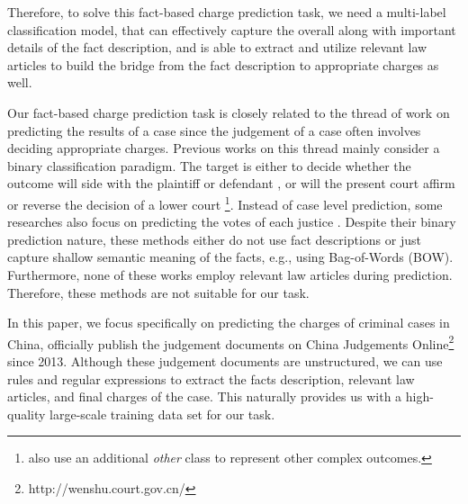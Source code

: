 Therefore, to solve this fact-based charge prediction task, we need a multi-label classification model, that can effectively capture the overall  along with important details of the fact description, and is able to extract and utilize relevant law articles to build the bridge from the fact description to appropriate charges as well. 

Our fact-based charge prediction task is closely related to the thread of work on predicting the results of a case since the judgement of a case often involves deciding appropriate charges. Previous works on this thread mainly consider a binary classification paradigm. The target is either to decide whether the outcome will side with the plaintiff or defendant \cite{aletras2016predicting}, or will the present court affirm or reverse the decision of a lower court \cite{katz2016general} \footnote{\cite{katz2016general} also use an additional \emph{other} class to represent other complex outcomes.}. Instead of case level prediction, some researches also focus on predicting the votes of each justice \cite{martin2002dynamic,lauderdale2014scaling,sim2015utility}. Despite their binary prediction nature, these methods either do not use fact descriptions or just capture shallow semantic meaning of the facts, e.g., using Bag-of-Words (BOW). Furthermore, none of these works employ relevant law articles during prediction. Therefore, these methods are not suitable for our task. 

In this paper, we focus specifically on predicting the charges of criminal cases in China,  officially publish the judgement documents on China Judgements Online\footnote{http://wenshu.court.gov.cn/} since 2013. Although these judgement documents are unstructured, we can use rules and regular expressions to extract the facts description, relevant law articles, and final charges of the case. This naturally provides us with a high-quality large-scale training data set for our task.

